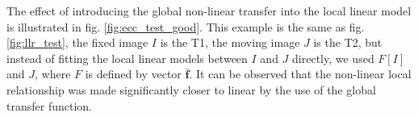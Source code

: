 The effect of introducing the global non-linear transfer into the local linear model is illustrated in fig. \ref{fig:ecc_test_good}. This example is the same as fig. \ref{fig:llr_test}, the fixed image $I$ is the T1, the moving image $J$ is the T2, but instead of fitting the local linear models between $I$ and $J$ directly, we used $F[I]$ and $J$, where $F$ is defined by vector $\mathbf{\bar{f}}$. It can be observed that the non-linear local relationship was made significantly closer to linear by the use of the global transfer function.
\begin{figure}[t]
\centering
    \\

\end{figure}
